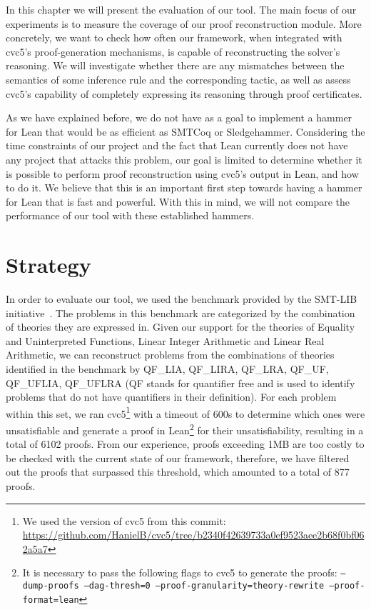 In this chapter we will present the evaluation of our tool.
%
The main focus of our experiments is to measure the coverage
of our proof reconstruction module.
%
More concretely, we want to check how often our framework, when
integrated with cvc5's proof-generation mechanisms, is capable
of reconstructing the solver's reasoning.
%
We will investigate whether there are any mismatches between
the semantics of some inference rule and the corresponding tactic,
as well as assess cvc5's capability of completely expressing
its reasoning through proof certificates.

As we have explained before, we do not have as a goal to implement a hammer
for Lean that would be as efficient as SMTCoq or Sledgehammer.
%
Considering the time constraints of our project and the fact that
Lean currently does not have any project that attacks this problem, our goal
is limited to determine whether it is possible to perform proof reconstruction
using cvc5's output in Lean, and how to do it.
%
We believe that this is an important first step towards having
a hammer for Lean that is fast and powerful.
%
With this in mind, we will not compare the performance of our tool
with these established hammers.

\section{Strategy}

In order to evaluate our tool, we used the benchmark provided
by the SMT-LIB initiative~\cite{smtlib_initiative}. The problems in this benchmark
are categorized by the combination of theories they are expressed in.
Given our support for the theories of Equality and Uninterpreted Functions,
Linear Integer Arithmetic and Linear Real Arithmetic, we can reconstruct problems
from the combinations of theories identified in the benchmark by QF\_LIA, QF\_LIRA,
QF\_LRA, QF\_UF, QF\_UFLIA, QF\_UFLRA (QF stands for quantifier free and is used
to identify problems that do not have quantifiers in their definition).
%
For each problem within this set, we ran cvc5\footnote{We used the version of
  cvc5 from this commit: \url{https://github.com/HanielB/cvc5/tree/b2340f42639733a0ef9523aee2b68f0bf062a5a7}}
with a timeout of 600s to determine
which ones were unsatisfiable and generate a proof in Lean\footnote{It is necessary to pass the following
  flags to cvc5 to generate the proofs: \texttt{--dump-proofs --dag-thresh=0
    --proof-granularity=theory-rewrite --proof-format=lean}} for their unsatisfiability,
resulting in a total of 6102 proofs.
%
From our experience, proofs exceeding 1MB are too costly to be checked
with the current state of our framework, therefore, we have filtered out the proofs
that surpassed this threshold, which amounted to a total of 877 proofs.

